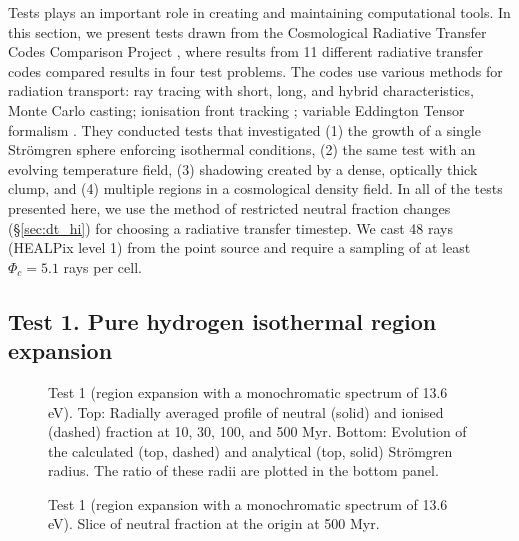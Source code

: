 \documentclass[useAMS,usenatbib]{mn2e}
\begin{document}
Tests plays an important role in creating and maintaining
computational tools.  In this section, we present tests drawn from the
Cosmological Radiative Transfer Codes Comparison Project \citep{RT06},
where results from 11 different radiative transfer codes compared
results in four test problems.  The codes use various methods for
radiation transport: ray tracing with short, long, and hybrid
characteristics, Monte Carlo casting; ionisation front tracking
\citep{Alvarez06_IFT}; variable Eddington Tensor formalism
\citep{Gnedin01_OTVET}.  They conducted tests that investigated (1)
the growth of a single Str\"{o}mgren sphere enforcing isothermal
conditions, (2) the same test with an evolving temperature field, (3)
shadowing created by a dense, optically thick clump, and (4) multiple
\hii regions in a cosmological density field.  In all of the
tests presented here, we use the method of restricted neutral fraction
changes (\S\ref{sec:dt_hi}) for choosing a radiative transfer
timestep.  We cast 48 rays (HEALPix level 1) from the point source and
require a sampling of at least $\Phi_c = 5.1$ rays per cell.

\subsection{Test 1. Pure hydrogen isothermal \hii region
  expansion}
\label{sec:test1}

\begin{figure}
  \caption{\label{fig:test1_ifront} Test 1 (\hii region
    expansion with a monochromatic spectrum of 13.6 eV).  Top:
    Radially averaged profile of neutral (solid) and ionised (dashed)
    fraction at 10, 30, 100, and 500 Myr.  Bottom: Evolution of the
    calculated (top, dashed) and analytical (top, solid) Str\"{o}mgren
    radius.  The ratio of these radii are plotted in the bottom panel.}
\end{figure}

\begin{figure}
  \caption{\label{fig:test1_HI} Test 1 (\hii region expansion
    with a monochromatic spectrum of 13.6 eV). Slice of neutral
    fraction at the origin at 500 Myr.}
\end{figure}
\end{document}
